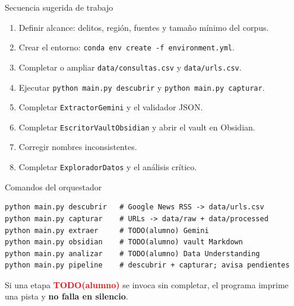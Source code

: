 \documentclass[11pt,aspectratio=169]{beamer}
\newcommand{\todo}{\textcolor{red}{\textbf{TODO(alumno)}}}
\newcommand{\code}[1]{\texttt{#1}}
\begin{document}
\begin{frame}{Secuencia sugerida de trabajo}
\scriptsize
\begin{enumerate}[<+->]
\item Definir alcance: delitos, región, fuentes y tamaño mínimo del corpus.
\item Crear el entorno: \code{conda env create -f environment.yml}.
\item Completar o ampliar \code{data/consultas.csv} y \code{data/urls.csv}.
\item Ejecutar \code{python main.py descubrir} y \code{python main.py capturar}.
\item Completar \code{ExtractorGemini} y el validador JSON.
\item Completar \code{EscritorVaultObsidian} y abrir el vault en Obsidian.
\item Corregir nombres inconsistentes.
\item Completar \code{ExploradorDatos} y el análisis crítico.
\end{enumerate}
\end{frame}

\begin{frame}[fragile]{Comandos del orquestador}
\tiny
\begin{lstlisting}
python main.py descubrir   # Google News RSS -> data/urls.csv
python main.py capturar    # URLs -> data/raw + data/processed
python main.py extraer     # TODO(alumno) Gemini
python main.py obsidian    # TODO(alumno) vault Markdown
python main.py analizar    # TODO(alumno) Data Understanding
python main.py pipeline    # descubrir + capturar; avisa pendientes
\end{lstlisting}

\scriptsize
Si una etapa \todo{} se invoca sin completar, el programa imprime una pista y \textbf{no falla en silencio}.
\end{frame}
\end{document}
